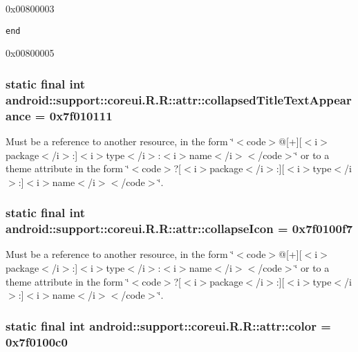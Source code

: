 0x00800003

{\tt end}

0x00800005\hypertarget{classandroid_1_1support_1_1coreui_1_1_r_1_1attr_7b1bea789c78b310efee255a9c1cda8f}{
\subsubsection[{collapsedTitleTextAppearance}]{\setlength{\rightskip}{0pt plus 5cm}static final int android::support::coreui.R.R::attr::collapsedTitleTextAppearance = 0x7f010111}}
\label{classandroid_1_1support_1_1coreui_1_1_r_1_1attr_7b1bea789c78b310efee255a9c1cda8f}


Must be a reference to another resource, in the form \char`\"{}$<$code$>$@\mbox{[}+\mbox{]}\mbox{[}$<$i$>$package$<$/i$>$:\mbox{]}$<$i$>$type$<$/i$>$:$<$i$>$name$<$/i$>$$<$/code$>$\char`\"{} or to a theme attribute in the form \char`\"{}$<$code$>$?\mbox{[}$<$i$>$package$<$/i$>$:\mbox{]}\mbox{[}$<$i$>$type$<$/i$>$:\mbox{]}$<$i$>$name$<$/i$>$$<$/code$>$\char`\"{}. \hypertarget{classandroid_1_1support_1_1coreui_1_1_r_1_1attr_cad80aab4ffc8812b07edc692dcb8e34}{
\subsubsection[{collapseIcon}]{\setlength{\rightskip}{0pt plus 5cm}static final int android::support::coreui.R.R::attr::collapseIcon = 0x7f0100f7}}
\label{classandroid_1_1support_1_1coreui_1_1_r_1_1attr_cad80aab4ffc8812b07edc692dcb8e34}


Must be a reference to another resource, in the form \char`\"{}$<$code$>$@\mbox{[}+\mbox{]}\mbox{[}$<$i$>$package$<$/i$>$:\mbox{]}$<$i$>$type$<$/i$>$:$<$i$>$name$<$/i$>$$<$/code$>$\char`\"{} or to a theme attribute in the form \char`\"{}$<$code$>$?\mbox{[}$<$i$>$package$<$/i$>$:\mbox{]}\mbox{[}$<$i$>$type$<$/i$>$:\mbox{]}$<$i$>$name$<$/i$>$$<$/code$>$\char`\"{}. \hypertarget{classandroid_1_1support_1_1coreui_1_1_r_1_1attr_a0cf42824ecdd73376c8284455a5dba4}{
\subsubsection[{color}]{\setlength{\rightskip}{0pt plus 5cm}static final int android::support::coreui.R.R::attr::color = 0x7f0100c0}}
\label{classandroid_1_1support_1_1coreui_1_1_r_1_1attr_a0cf42824ecdd73376c8284455a5dba4}


